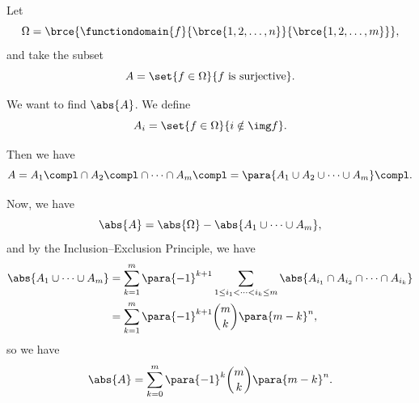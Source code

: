 \begin{example}
    \label{ex:counting-surjections}%
    Let
    \[
        \Omega = \brce{\functiondomain{f}{\brce{1, 2, \ldots, n}}{\brce{1, 2, \ldots, m}}},
    \]
    and take the subset
    \[
        A = \set{f \in \Omega}{f \text{ is surjective}}.
    \]

    We want to find \(\abs{A}\). We define
    \[
        A_i = \set{f \in \Omega}{i \notin \img f}.
    \]

    Then we have
    \[
        A = A_1\compl \cap A_2\compl \cap \cdots \cap A_m\compl = \para{A_1 \cup A_2 \cup \cdots \cup A_m}\compl.
    \]

    Now, we have
    \[
        \abs{A} = \abs{\Omega} - \abs{A_1 \cup \cdots \cup A_m},
    \]
    and by the Inclusion--Exclusion Principle, we have
    \begin{align*}
        \abs{A_1 \cup \cdots \cup A_m} &= \sum_{k = 1}^{m} \para{-1}^{k + 1} \sum_{1 \leq i_1 < \cdots < i_k \leq m} \abs{A_{i_1} \cap A_{i_2} \cap \cdots \cap A_{i_k}} \\
        &= \sum_{k = 1}^{m} \para{-1}^{k + 1} \binom{m}{k} \para{m - k}^n,
    \end{align*}
    so we have
    \[
        \abs{A} = \sum_{k = 0}^{m} \para{-1}^{k} \binom{m}{k} \para{m - k}^{n}.
    \]
\end{example}

